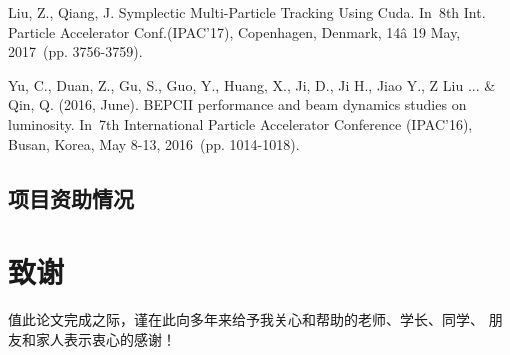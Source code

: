 Liu, Z., Qiang, J. Symplectic Multi-Particle Tracking Using Cuda. In 8th Int. Particle Accelerator Conf.(IPAC'17), Copenhagen, Denmark, 14â 19 May, 2017 (pp. 3756-3759).

Yu, C., Duan, Z., Gu, S., Guo, Y., Huang, X., Ji, D., Ji H., Jiao Y., Z Liu ... \& Qin, Q. (2016, June). BEPCII performance and beam dynamics studies on luminosity. In 7th International Particle Accelerator Conference (IPAC'16), Busan, Korea, May 8-13, 2016 (pp. 1014-1018).




\section*{项目资助情况}


\chapter{致\quad 谢}

值此论文完成之际，谨在此向多年来给予我关心和帮助的老师、学长、同学、
朋友和家人表示衷心的感谢！
